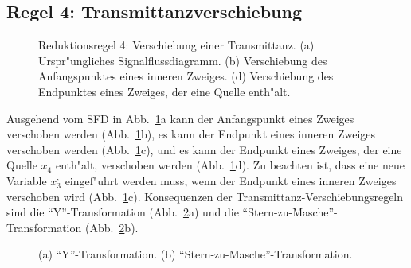 \subsection{Regel 4: Transmittanzverschiebung } 
\begin{figure}[htb!]
\vspace*{-3mm}\begin{center}
  \caption{Reduktionsregel 4: Verschiebung einer
Transmittanz. (a) Urspr"ungliches Signalflussdiagramm. (b)
Verschiebung des Anfangspunktes eines inneren Zweiges. (d)
Verschiebung des Endpunktes eines Zweiges, der eine Quelle enth"alt.}\label{SFD10}
\end{center}
\vspace*{-7mm}
\end{figure}
\nit Ausgehend vom SFD in Abb.~\ref{SFD10}a kann der
Anfangspunkt eines Zweiges verschoben werden (Abb.~\ref{SFD10}b), es
kann der Endpunkt eines inneren Zweiges verschoben werden
(Abb.~\ref{SFD10}c), und es kann der Endpunkt eines Zweiges, der eine
Quelle $x_4$ enth"alt, verschoben werden (Abb.~\ref{SFD10}d). Zu
beachten ist, dass eine neue Variable $x_3^{\mbox{,}}$ eingef"uhrt werden muss,
wenn der Endpunkt eines inneren Zweiges verschoben wird
(Abb.~\ref{SFD10}c).  Konsequenzen der
Transmittanz-Verschiebungsregeln sind die ``Y''-Transformation
(Abb.~\ref{SFD11}a) und die
``Stern-zu-Masche''-Transformation
 (Abb.~\ref{SFD11}b).\\
\begin{figure}[htb!]
\begin{center}
  \caption{(a)
    ``Y''-Transformation. (b) ``Stern-zu-Masche''-Transformation.
    }\label{SFD11}
\end{center}
\vspace*{-7mm}
\end{figure}
